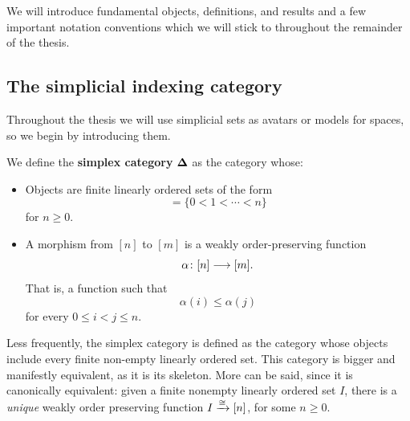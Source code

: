 We will introduce fundamental objects, definitions, and results and a few important notation conventions which we will stick to throughout the remainder of the thesis.


\subsection{The simplicial indexing category}

Throughout the thesis we will use simplicial sets as avatars or models for spaces, so we begin by introducing them.

\begin{definition}\label{ch2:: def: simplex category}
    We define the \textbf{simplex category} $\mathbf\Delta$ as the category whose:
    \begin{itemize}
        \item Objects are finite linearly ordered sets of the form 
        \begin{equation}
        [n] = \{0 < 1 < \cdots < n\}
        \end{equation} for $n\geq 0$.
        \item A morphism from $[n]$ to $[m]$ is a weakly order-preserving function
        \begin{equation}
            \alpha \colon [n] \longrightarrow [m].
        \end{equation} That is, a function such that 
        \begin{equation}
            \alpha(i) \leq \alpha(j)
        \end{equation}
        for every $0\leq i < j \leq n$.
    \end{itemize}
\end{definition}

\begin{observation}
    Less frequently, the simplex category is defined as the category whose objects include every finite non-empty linearly ordered set. This category is bigger and manifestly equivalent, as it is its skeleton. More can be said, since it is canonically equivalent: given a finite nonempty linearly ordered set $I$, there is a \emph{unique} weakly order preserving function $I \xrightarrow{\cong} [n]$, for some $n\geq 0$.  
\end{observation}

